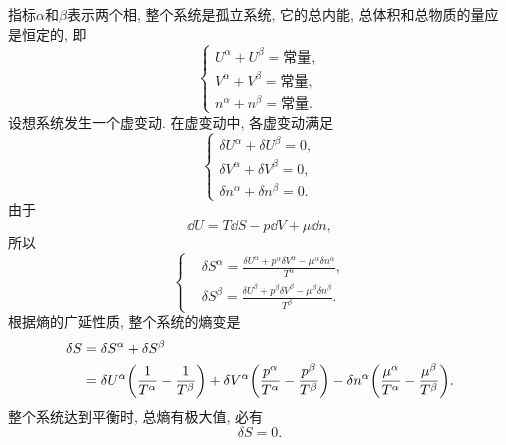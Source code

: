 \begin{questions}
\begin{solution}
    指标$\alpha$和$\beta$表示两个相, 整个系统是孤立系统, 它的总内能, 总体积和总物质的量应是恒定的, 即
    \begin{equation}
      \left\{\begin{aligned}
        U^\alpha + U^\beta = \text{常量}, \\
        V^\alpha + V^\beta = \text{常量}, \\
        n^\alpha + n^\beta = \text{常量}.
      \end{aligned}\right.
    \end{equation}
    设想系统发生一个虚变动. 在虚变动中, 各虚变动满足
    \begin{equation}
      \left\{\begin{aligned}
        \delta U^\alpha +\delta U^\beta =0, \\
        \delta V^\alpha +\delta V^\beta =0, \\
        \delta n^\alpha +\delta n^\beta =0.
      \end{aligned}\right.
    \end{equation}
    由于
    \begin{equation}
      \dd U = T\dd S - p\dd V + \mu\dd n,
    \end{equation}
    所以
    \begin{equation}
      \left\{\begin{aligned}
         & \delta S^\alpha = \frac{\delta U^\alpha+p^\alpha\delta V^\alpha-\mu^\alpha\delta n^\alpha}{T^\alpha}, \\
         & \delta S^\beta = \frac{\delta U^\beta+p^\beta\delta V^\beta-\mu^\beta\delta n^\beta}{T^\beta}.
      \end{aligned}\right.
    \end{equation}
    根据熵的广延性质, 整个系统的熵变是
    \begin{equation}
      \begin{aligned}
        \delta S & = \delta S^\alpha + \delta S^\beta                          \\
                 & = \delta U^\alpha\qty(\frac{1}{T^\alpha}-\frac{1}{T^\beta})
        + \delta V^\alpha
        \qty(\frac{p^\alpha}{T^\alpha}-\frac{p^\beta}{T^\beta})
        - \delta n^\alpha\qty(\frac{\mu^\alpha}{T^\alpha}-\frac{\mu^\beta}{T^\beta}).
      \end{aligned}
    \end{equation}
    整个系统达到平衡时, 总熵有极大值, 必有
    \begin{equation}
      \delta S = 0.
    \end{equation}

\end{solution}
\end{questions}
